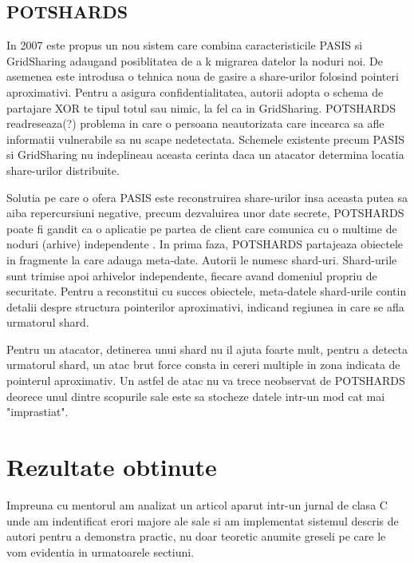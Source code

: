 \documentclass{llncs}
\begin{document}
\subsection{POTSHARDS} 
In 2007 este propus un nou sistem care combina caracteristicile PASIS si GridSharing adaugand posiblitatea de a k migrarea datelor la noduri noi.
De asemenea este introdusa o tehnica noua de gasire a share-urilor folosind pointeri aproximativi. Pentru a asigura confidentialitatea, autorii adopta o schema de partajare XOR te tipul totul sau nimic, la fel ca in GridSharing.
POTSHARDS readreseaza(?) problema in care o persoana neautorizata care incearca sa afle informatii vulnerabile sa nu scape nedetectata. Schemele existente precum PASIS si GridSharing nu indeplineau aceasta cerinta daca un atacator determina locatia share-urilor distribuite.

Solutia pe care o ofera PASIS este reconstruirea share-urilor insa aceasta putea sa aiba repercursiuni negative, precum dezvaluirea unor date secrete,
POTSHARDS poate fi gandit ca o aplicatie pe partea de client care comunica cu o multime de noduri (arhive) independente . In prima faza, POTSHARDS partajeaza obiectele in fragmente la care adauga meta-date. Autorii le numesc shard-uri. Shard-urile sunt trimise apoi arhivelor independente, fiecare avand domeniul propriu de securitate. Pentru a reconstitui cu succes obiectele, meta-datele shard-urile contin detalii despre structura pointerilor aproximativi, indicand regiunea in care se afla urmatorul shard.

Pentru un atacator, detinerea unui shard nu il ajuta foarte mult, pentru a detecta urmatorul shard, un atac brut force consta in cereri multiple in zona indicata de pointerul aproximativ. Un astfel de atac nu va trece neobservat de POTSHARDS deorece unul dintre scopurile sale este sa stocheze datele intr-un mod cat mai "imprastiat".\cite{SGMV:2009} 

\section{Rezultate obtinute}
Impreuna cu mentorul am analizat un articol aparut intr-un jurnal de clasa C unde am indentificat erori majore ale sale si am implementat sistemul descris de autori pentru a demonstra practic, nu doar teoretic anumite greseli pe care le vom evidentia in urmatoarele sectiuni. \cite{AAMK:2013}
\end{document}

